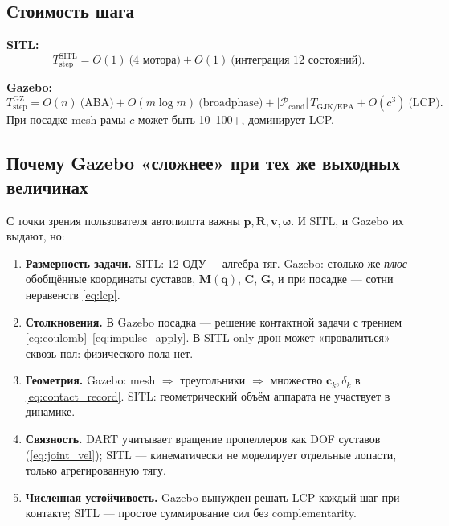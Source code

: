 \documentclass[a4paper,11pt]{article}
\newcommand{\vect}[1]{\bm{#1}}
\newcommand{\mat}[1]{\bm{#1}}
\begin{document}
\subsection{Стоимость шага}

\textbf{SITL:}
\begin{equation}
  T_{\mathrm{step}}^{\mathrm{SITL}} =
  O(1)\ \text{(4 мотора)} + O(1)\ \text{(интеграция 12 состояний)}.
  \label{eq:cost_sitl}
\end{equation}

\textbf{Gazebo:}
\begin{equation}
  T_{\mathrm{step}}^{\mathrm{GZ}} =
  O(n)\ \text{(ABA)} +
  O(m \log m)\ \text{(broadphase)} +
  |\mathcal{P}_{\mathrm{cand}}|\,T_{\mathrm{GJK/EPA}} +
  O(c^3)\ \text{(LCP)}.
  \label{eq:cost_gazebo}
\end{equation}
При посадке mesh-рамы $c$ может быть 10--100+, доминирует LCP.

\subsection{Почему Gazebo «сложнее» при тех же выходных величинах}

С точки зрения пользователя автопилота важны
$\vect{p}, \mat{R}, \vect{v}, \vect{\omega}$.
И SITL, и Gazebo их выдают, но:

\begin{enumerate}
  \item \textbf{Размерность задачи.}
  SITL: 12 ОДУ + алгебра тяг. Gazebo: столько же \emph{плюс}
  обобщённые координаты суставов, $\mat{M}(\vect{q})$, $\vect{C}$, $\vect{G}$,
  и при посадке --- сотни неравенств \eqref{eq:lcp}.

  \item \textbf{Столкновения.}
  В Gazebo посадка --- решение контактной задачи с трением
  \eqref{eq:coulomb}--\eqref{eq:impulse_apply}.
  В SITL-only дрон может «провалиться» сквозь пол: физического пола нет.

  \item \textbf{Геометрия.}
  Gazebo: mesh $\Rightarrow$ треугольники $\Rightarrow$ множество
  $\vect{c}_k, \delta_k$ в \eqref{eq:contact_record}.
  SITL: геометрический объём аппарата не участвует в динамике.

  \item \textbf{Связность.}
  DART учитывает вращение пропеллеров как DOF суставов
  (\eqref{eq:joint_vel}); SITL --- кинематически не моделирует отдельные
  лопасти, только агрегированную тягу.

  \item \textbf{Численная устойчивость.}
  Gazebo вынужден решать LCP каждый шаг при контакте;
  SITL --- простое суммирование сил без complementarity.
\end{enumerate}
\end{document}
